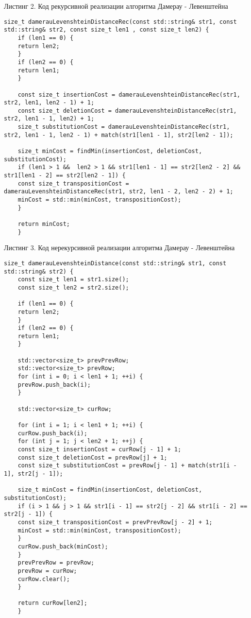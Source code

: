 \documentclass[a4paper, 14pt]{article}
\begin{document}
	
	 \small Листинг 2. Код рекурсивной реализации алгоритма Дамерау - Левенштейна \normalsize
	\begin{lstlisting}[frame=single, breaklines]
	size_t damerauLevenshteinDistanceRec(const std::string& str1, const std::string& str2, const size_t len1 , const size_t len2) {
	if (len1 == 0) {
	return len2;
	}
	if (len2 == 0) {
	return len1;
	}
	
	const size_t insertionCost = damerauLevenshteinDistanceRec(str1, str2, len1, len2 - 1) + 1;
	const size_t deletionCost = damerauLevenshteinDistanceRec(str1, str2, len1 - 1, len2) + 1;
	size_t substitutionCost = damerauLevenshteinDistanceRec(str1, str2, len1 - 1, len2 - 1) + match(str1[len1 - 1], str2[len2 - 1]);
	
	size_t minCost = findMin(insertionCost, deletionCost, substitutionCost);
	if (len1 > 1 &&  len2 > 1 && str1[len1 - 1] == str2[len2 - 2] && str1[len1 - 2] == str2[len2 - 1]) {
	const size_t transpositionCost = damerauLevenshteinDistanceRec(str1, str2, len1 - 2, len2 - 2) + 1;
	minCost = std::min(minCost, transpositionCost);
	}
	
	return minCost;
	}
	\end{lstlisting}
	
	\small Листинг 3. Код нерекурсивной реализации алгоритма Дамерау - Левенштейна \normalsize
	
	\begin{lstlisting}[frame=single, breaklines]
	size_t damerauLevenshteinDistance(const std::string& str1, const std::string& str2) {
	const size_t len1 = str1.size();
	const size_t len2 = str2.size();
	
	if (len1 == 0) {
	return len2;
	}
	if (len2 == 0) {
	return len1;
	}
	
	std::vector<size_t> prevPrevRow;
	std::vector<size_t> prevRow;
	for (int i = 0; i < len1 + 1; ++i) {
	prevRow.push_back(i);
	}
	
	std::vector<size_t> curRow;
	
	for (int i = 1; i < len1 + 1; ++i) {
	curRow.push_back(i);
	for (int j = 1; j < len2 + 1; ++j) {
	const size_t insertionCost = curRow[j - 1] + 1;
	const size_t deletionCost = prevRow[j] + 1;
	const size_t substitutionCost = prevRow[j - 1] + match(str1[i - 1], str2[j - 1]);
	
	size_t minCost = findMin(insertionCost, deletionCost, substitutionCost);
	if (i > 1 && j > 1 && str1[i - 1] == str2[j - 2] && str1[i - 2] == str2[j - 1]) {
	const size_t transpositionCost = prevPrevRow[j - 2] + 1;
	minCost = std::min(minCost, transpositionCost);
	}
	curRow.push_back(minCost);
	}
	prevPrevRow = prevRow;
	prevRow = curRow;
	curRow.clear();
	}
	
	return curRow[len2];
	}
	\end{lstlisting}
	
\end{document}
